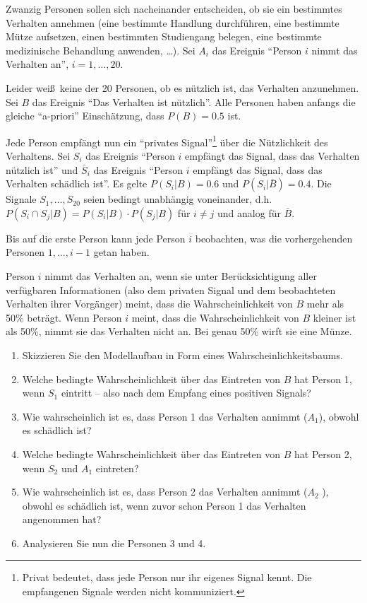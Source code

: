 \begin{enumerate}
Zwanzig Personen sollen sich nacheinander entscheiden, ob sie ein bestimmtes
Verhalten annehmen (eine bestimmte Handlung durchf\"{u}hren, eine bestimmte Mütze 
aufsetzen, einen bestimmten Studiengang belegen, eine bestimmte
medizinische Behandlung anwenden, \ldots ). Sei $A_{i}$ das Ereignis
"`Person $i$ nimmt das Verhalten an"', $i=1,\ldots ,20$.

Leider wei\ss\ keine der 20 Personen, ob es n\"{u}tzlich ist, das Verhalten
anzunehmen. Sei $B$ das Ereignis "`Das Verhalten ist nützlich"'. 
Alle Personen haben anfangs die gleiche "`a-priori"' 
Einsch\"{a}tzung, dass $P(B)=0.5$ ist.

Jede Person empf\"{a}ngt nun ein "`privates Signal"'\footnote{Privat 
bedeutet, dass jede Person nur ihr eigenes Signal kennt. Die
empfangenen Signale werden nicht kommuniziert.} \"{u}ber die Nützlichkeit 
des Verhaltens. Sei $S_{i}$ das Ereignis "`Person $i$ empf\"{a}ngt das 
Signal, dass das Verhalten n\"{u}tzlich ist"' und $\bar{S}_{i}$ das Ereignis 
"`Person $i $ empf\"{a}ngt das Signal, dass das Verhalten sch\"{a}dlich
ist"'. Es gelte $P(S_{i}|B)=0.6$ und $P(S_{i}|\bar{B})=0.4$. 
Die Signale $S_{1},\ldots ,S_{20}$ seien bedingt unabh\"{a}ngig
voneinander, d.h. $P(S_{i}\cap S_{j}|B)=P(S_{i}|B)\cdot P(S_{j}|B)$ f\"{u}r 
$i\neq j$ und analog f\"{u}r $\bar{B}$.

Bis auf die erste Person kann jede Person $i$ beobachten, was die
vorhergehenden Personen $1,\ldots ,i-1$ getan haben.

Person $i$ nimmt das Verhalten an, wenn sie unter Ber\"{u}cksichtigung aller
verf\"{u}gbaren Informationen (also dem privaten Signal und dem beobachteten
Verhalten ihrer Vorg\"{a}nger) meint, dass die Wahrscheinlichkeit von $B$
mehr als 50\% betr\"{a}gt. Wenn Person $i$ meint, dass die
Wahrscheinlichkeit von $B$ kleiner ist als 50\%, nimmt sie das Verhalten
nicht an. Bei genau 50\% wirft sie eine M\"{u}nze.
\begin{enumerate}
\item Skizzieren Sie den Modellaufbau in Form eines Wahrscheinlichkeitsbaums.
\item Welche bedingte Wahrscheinlichkeit \"{u}ber das Eintreten von $B$ hat
Person 1, wenn $S_{1}$ eintritt -- also nach dem Empfang eines positiven
Signals?
\item Wie wahrscheinlich ist es, dass Person 1 das Verhalten annimmt ($A_{1}$), 
obwohl es sch\"{a}dlich ist?
\item Welche bedingte Wahrscheinlichkeit \"{u}ber das Eintreten von $B$ hat
Person 2, wenn $S_{2}$ und $A_{1}$ eintreten?
\item Wie wahrscheinlich ist es, dass Person 2 das Verhalten annimmt ($A_{2}$%
), obwohl es sch\"{a}dlich ist, wenn zuvor schon Person 1 das Verhalten
angenommen hat?
\item Analysieren Sie nun die Personen 3 und 4.
\end{enumerate}


\end{enumerate}
